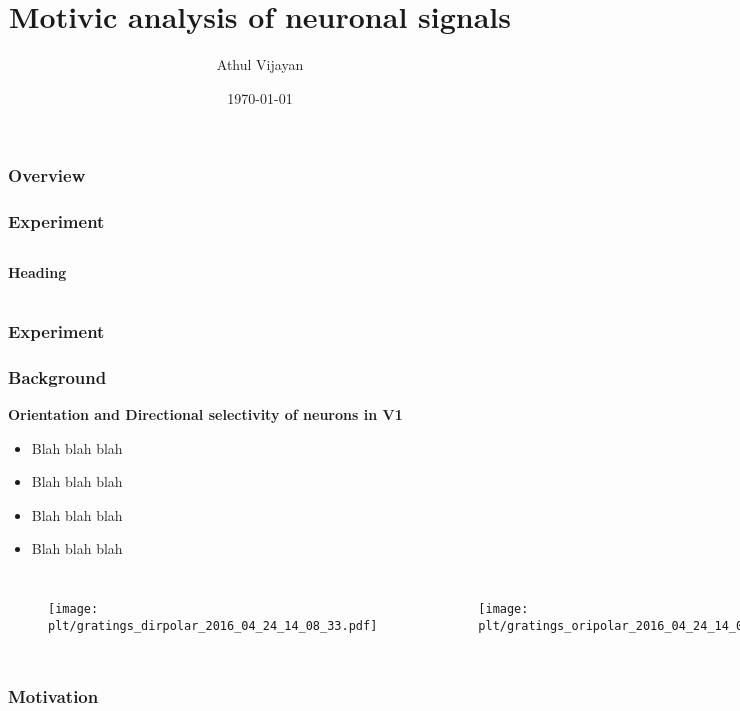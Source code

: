 \documentclass{beamer}
\title[Motivic analysis]{Motivic analysis of neuronal signals} %
\author{Athul Vijayan} %
\institute[DON Lab] %
{
IIT Madras \\ %
\medskip
\textit{athulvijayan6@gmail.com} %
}
\date{\today} %
\newcommand{\plt}{../../plots}
\begin{document}
\begin{frame}
\titlepage %
\end{frame}

\begin{frame}
\frametitle{Overview}

\end{frame}

\begin{frame}
\frametitle{Experiment}
\begin{columns}[c] %

\textbf{Heading}

\end{columns}

\end{frame}

\begin{frame}
\frametitle{Experiment}
\begin{center}
\end{center}
\end{frame}

\begin{frame}
\frametitle{Background}
\textbf{Orientation and Directional selectivity of neurons in V1}
\begin{itemize}
    \item Blah blah blah
    \item Blah blah blah
    \item Blah blah blah
    \item Blah blah blah
\end{itemize}
\begin{columns}[c]
\begin{figure}
\texttt{[image: \\plt/gratings\_dirpolar\_2016\_04\_24\_14\_08\_33.pdf]}
\end{figure}
\begin{figure}
\texttt{[image: \\plt/gratings\_oripolar\_2016\_04\_24\_14\_08\_33.pdf]}
\end{figure}
\end{columns}
\end{frame}

\begin{frame}
\frametitle{Motivation}

\end{frame}
\end{document}
